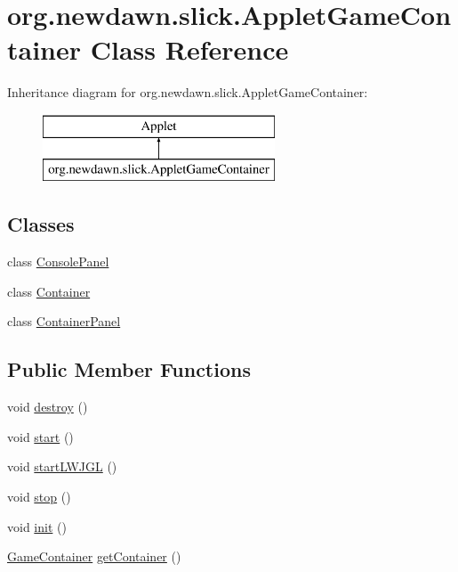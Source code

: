 \hypertarget{classorg_1_1newdawn_1_1slick_1_1_applet_game_container}{}\section{org.\+newdawn.\+slick.\+Applet\+Game\+Container Class Reference}
\label{classorg_1_1newdawn_1_1slick_1_1_applet_game_container}
Inheritance diagram for org.\+newdawn.\+slick.\+Applet\+Game\+Container\+:\begin{figure}[H]
\begin{center}
\leavevmode
\includegraphics[height=2.000000cm]{classorg_1_1newdawn_1_1slick_1_1_applet_game_container}
\end{center}
\end{figure}
\subsection*{Classes}
\begin{DoxyCompactItemize}
\item 
class \mbox{\hyperlink{classorg_1_1newdawn_1_1slick_1_1_applet_game_container_1_1_console_panel}{Console\+Panel}}
\item 
class \mbox{\hyperlink{classorg_1_1newdawn_1_1slick_1_1_applet_game_container_1_1_container}{Container}}
\item 
class \mbox{\hyperlink{classorg_1_1newdawn_1_1slick_1_1_applet_game_container_1_1_container_panel}{Container\+Panel}}
\end{DoxyCompactItemize}
\subsection*{Public Member Functions}
\begin{DoxyCompactItemize}
\item 
void \mbox{\hyperlink{classorg_1_1newdawn_1_1slick_1_1_applet_game_container_aa7a9fa819a8255d5b902f9e941d31491}{destroy}} ()
\item 
void \mbox{\hyperlink{classorg_1_1newdawn_1_1slick_1_1_applet_game_container_a4eaf8c9a006d8877050863c07da85c3f}{start}} ()
\item 
void \mbox{\hyperlink{classorg_1_1newdawn_1_1slick_1_1_applet_game_container_af95e36a2d15fa8475f93483776eb2fe3}{start\+L\+W\+J\+GL}} ()
\item 
void \mbox{\hyperlink{classorg_1_1newdawn_1_1slick_1_1_applet_game_container_ad376fb700e65999dafc33171e4334560}{stop}} ()
\item 
void \mbox{\hyperlink{classorg_1_1newdawn_1_1slick_1_1_applet_game_container_ae10d7b8c504322bcbf04333382230df1}{init}} ()
\item 
\mbox{\hyperlink{classorg_1_1newdawn_1_1slick_1_1_game_container}{Game\+Container}} \mbox{\hyperlink{classorg_1_1newdawn_1_1slick_1_1_applet_game_container_aab420b4026d156dcfb6b5b2bc614d5ce}{get\+Container}} ()
\end{DoxyCompactItemize}
